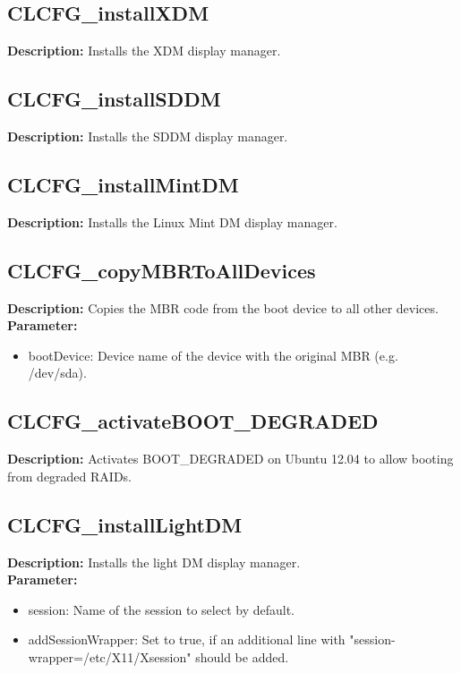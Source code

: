 \subsection{CLCFG\_installXDM}
\textbf{Description:} Installs the XDM display manager.\\

\subsection{CLCFG\_installSDDM}
\textbf{Description:} Installs the SDDM display manager.\\

\subsection{CLCFG\_installMintDM}
\textbf{Description:} Installs the Linux Mint DM display manager.\\

\subsection{CLCFG\_copyMBRToAllDevices}
\textbf{Description:} Copies the MBR code from the boot device to all other devices.\\
\textbf{Parameter:}
\begin{itemize}
\item bootDevice: Device name of the device with the original MBR (e.g. /dev/sda).
\end{itemize}

\subsection{CLCFG\_activateBOOT\_DEGRADED}
\textbf{Description:} Activates BOOT\_DEGRADED on Ubuntu 12.04 to allow booting from degraded RAIDs.\\

\subsection{CLCFG\_installLightDM}
\textbf{Description:} Installs the light DM display manager.\\
\textbf{Parameter:}
\begin{itemize}
\item session: Name of the session to select by default.
\item addSessionWrapper: Set to true, if an additional line with "session-wrapper=/etc/X11/Xsession" should be added.
\end{itemize}

